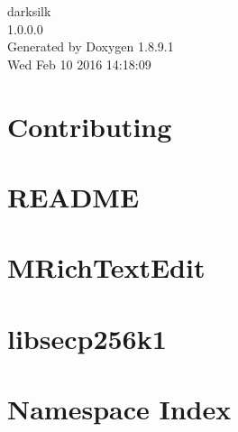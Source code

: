\documentclass[twoside]{book}
\newcommand{\+}{\discretionary{\mbox{\scriptsize$\hookleftarrow$}}{}{}}
\newcommand{\clearemptydoublepage}{%
  \newpage{\pagestyle{empty}\cleardoublepage}%
}
\begin{document}
\hypersetup{pageanchor=false,
             bookmarks=true,
             bookmarksnumbered=true,
             pdfencoding=unicode
            }
\begin{titlepage}
\vspace*{7cm}
\begin{center}%
{\Large darksilk \\[1ex]\large 1.\+0.\+0.\+0 }\\
\vspace*{1cm}
{\large Generated by Doxygen 1.8.9.1}\\
\vspace*{0.5cm}
{\small Wed Feb 10 2016 14:18:09}\\
\end{center}
\end{titlepage}
\clearemptydoublepage
\tableofcontents
\clearemptydoublepage
{}
\hypersetup{pageanchor=true}

\chapter{Contributing}
\label{md__home_dev_ds-160209_src_leveldb__c_o_n_t_r_i_b_u_t_i_n_g}
\hypertarget{md__home_dev_ds-160209_src_leveldb__c_o_n_t_r_i_b_u_t_i_n_g}{}

\chapter{R\+E\+A\+D\+M\+E}
\label{md__home_dev_ds-160209_src_leveldb__r_e_a_d_m_e}
\hypertarget{md__home_dev_ds-160209_src_leveldb__r_e_a_d_m_e}{}

\chapter{M\+Rich\+Text\+Edit}
\label{md__home_dev_ds-160209_src_qt_plugins_mrichtexteditor__r_e_a_d_m_e}
\hypertarget{md__home_dev_ds-160209_src_qt_plugins_mrichtexteditor__r_e_a_d_m_e}{}

\chapter{libsecp256k1}
\label{md__home_dev_ds-160209_src_secp256k1__r_e_a_d_m_e}
\hypertarget{md__home_dev_ds-160209_src_secp256k1__r_e_a_d_m_e}{}

\chapter{Namespace Index}

\end{document}
